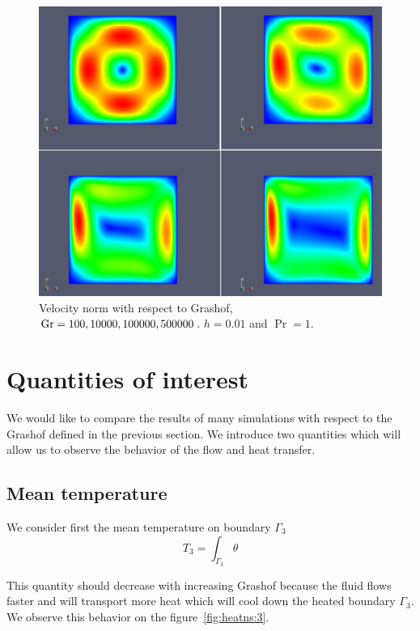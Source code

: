 \begin{figure}[htbp]
  \centering
  \includegraphics[width=.8\linewidth]{pngs/flow_grashof}
  \caption{Velocity norm with respect to  Grashof, $\mathrm{Gr}=100, 10000,
    100000, 500000$. $h=0.01$ and $\Pr=1$.}
  \label{fig:heatns:2}
\end{figure}

\section{Quantities of interest}
\label{sec:quant-du-benchm}

We would like to compare the results of many simulations with respect
to the Grashof defined in the previous section. We introduce two
quantities which will allow us to observe the behavior of the flow and
heat transfer.


\subsection{Mean temperature}
\label{sec:mean-temperature}

We consider first the mean temperature on boundary $\Gamma_3$
\begin{equation}
  \label{eq:16}
  T_3 = \int_{\Gamma_3} \theta
\end{equation}

This quantity should decrease with increasing Grashof because the
fluid flows faster and will transport more heat which will cool down
the heated boundary $\Gamma_3$. We observe this behavior on the
figure~\ref{fig:heatns:3}.


